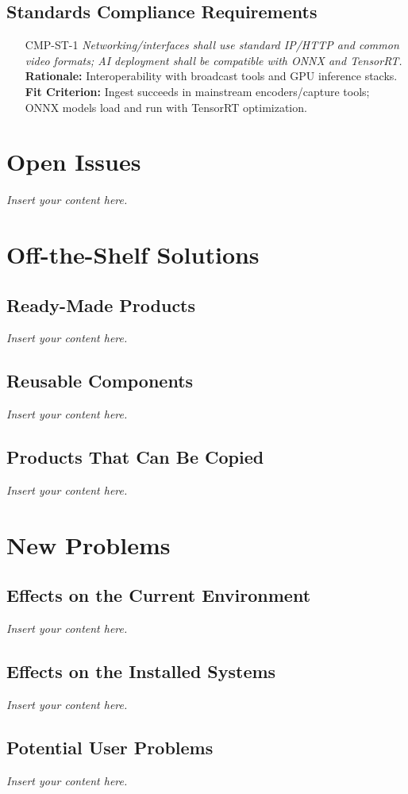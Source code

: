 \documentclass[12pt]{article}
\newcommand{\lips}{\textit{Insert your content here.}}
\begin{document}
\subsection{Standards Compliance Requirements}
\begin{itemize}[leftmargin=*]
  \item[CMP-ST-1] \emph{Networking/interfaces shall use standard IP/HTTP and common video formats; AI deployment shall be compatible with ONNX and TensorRT.}\\
  \textbf{Rationale:} Interoperability with broadcast tools and GPU inference stacks.\\
  \textbf{Fit Criterion:} Ingest succeeds in mainstream encoders/capture tools; ONNX models load and run with TensorRT optimization.
\end{itemize}

\section{Open Issues}
\lips

\section{Off-the-Shelf Solutions}
\subsection{Ready-Made Products}
\lips
\subsection{Reusable Components}
\lips
\subsection{Products That Can Be Copied}
\lips

\section{New Problems}
\subsection{Effects on the Current Environment}
\lips
\subsection{Effects on the Installed Systems}
\lips
\subsection{Potential User Problems}
\lips
\end{document}
